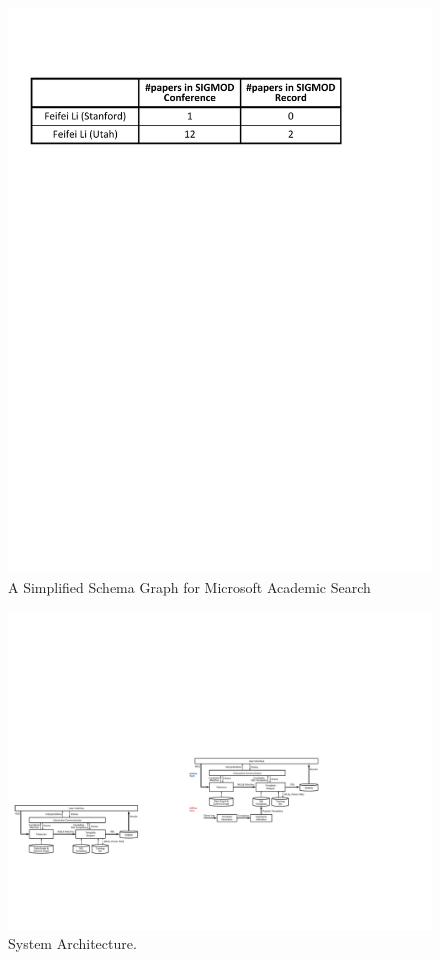 \documentclass{vldb}
\begin{document}
\begin{figure}
  \center
  \includegraphics[width=0.9\linewidth]{pic/feifeili.pdf}
  \caption{A Simplified Schema Graph for Microsoft Academic Search}
  \label{fig:paperfeifeili}
\end{figure}

\begin{figure}
  \center
  \includegraphics[width=0.8\linewidth]{pic/systemArchitecture.pdf}
  \caption{System Architecture.}
  \label{fig:systemArchitecture}
\end{figure}
\end{document}

